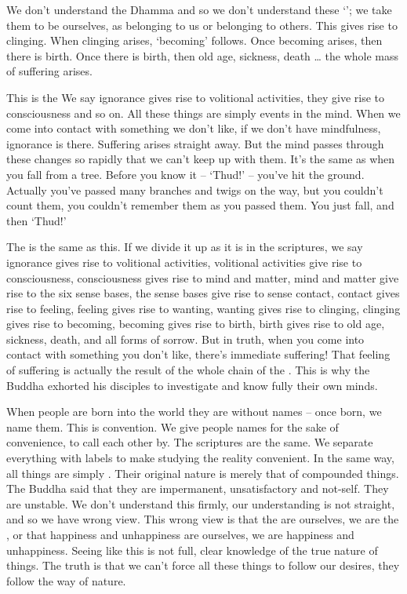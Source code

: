 We don't understand the Dhamma and so we don't understand these `'; we take them to be ourselves, as belonging to us or belonging to others. This gives rise to clinging. When clinging arises, `becoming' follows. Once becoming arises, then there is birth. Once there is birth, then old age, sickness, death \ldots{} the whole mass of suffering arises. 

This is the  We say ignorance gives rise to volitional activities, they give rise to consciousness and so on. All these things are simply events in the mind. When we come into contact with something we don't like, if we don't have mindfulness, ignorance is there. Suffering arises straight away. But the mind passes through these changes so rapidly that we can't keep up with them. It's the same as when you fall from a tree. Before you know it -- `Thud!' -- you've hit the ground. Actually you've passed many branches and twigs on the way, but you couldn't count them, you couldn't remember them as you passed them. You just fall, and then `Thud!' 

The  is the same as this. If we divide it up as it is in the scriptures, we say ignorance gives rise to volitional activities, volitional activities give rise to consciousness, consciousness gives rise to mind and matter, mind and matter give rise to the six sense bases, the sense bases give rise to sense contact, contact gives rise to feeling, feeling gives rise to wanting, wanting gives rise to clinging, clinging gives rise to becoming, becoming gives rise to birth, birth gives rise to old age, sickness, death, and all forms of sorrow. But in truth, when you come into contact with something you don't like, there's immediate suffering! That feeling of suffering is actually the result of the whole chain of the . This is why the Buddha exhorted his disciples to investigate and know fully their own minds. 

When people are born into the world they are without names -- once born, we name them. This is convention. We give people names for the sake of convenience, to call each other by. The scriptures are the same. We separate everything with labels to make studying the reality convenient. In the same way, all things are simply . Their original nature is merely that of compounded things. The Buddha said that they are impermanent, unsatisfactory and not-self. They are unstable. We don't understand this firmly, our understanding is not straight, and so we have wrong view. This wrong view is that the  are ourselves, we are the , or that happiness and unhappiness are ourselves, we are happiness and unhappiness. Seeing like this is not full, clear knowledge of the true nature of things. The truth is that we can't force all these things to follow our desires, they follow the way of nature. 

